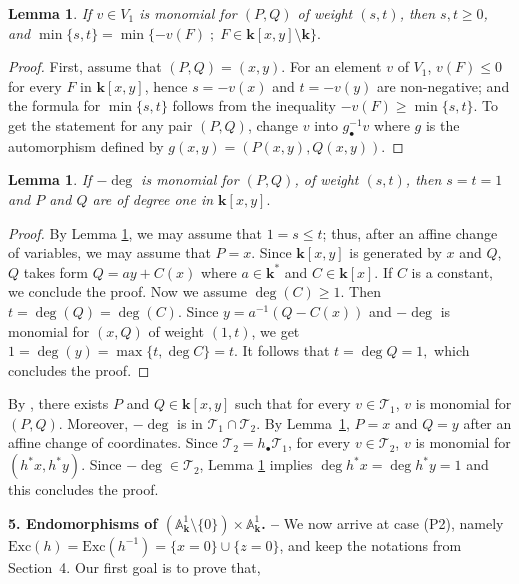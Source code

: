 \documentclass[reqno,oneside,12pt]{amsart}
\theoremstyle{plain}
\newtheorem{lem}[thm]{Lemma}
\theoremstyle{definition}
\def\bfk{{\mathbf{k}}}
\newcommand{\bbA}{{\mathbb{A}}}
\newcommand{\sT}{{\mathcal T}}
\def\Exc{{\text{Exc}}}
\begin{document}
{{{{\begin{lem}\label{lemprovow}If $v\in V_1$ is monomial for $(P,Q)$ of weight $(s,t)$, then   $s,t\geq 0$, and $\min\{s,t\}=\min\{-v(F) \; ; \; F\in \bfk[x,y]\setminus \bfk\}.$
\end{lem}
\begin{proof}
First, assume that $(P,Q)=(x,y)$. For an element $v$ of $V_1$, $v(F)\leq 0$ for every $F$ in $\bfk[x,y]$, hence $s=-v(x)$ and $t=-v(y)$
are non-negative; and the formula for $\min\{s,t\}$ follows from the inequality $-v(F)\geq \min\{s,t\}$. To get the statement for any pair $(P,Q)$, 
change $v$ into $g^{-1}_\bullet v$ where $g$ is the automorphism defined by $g(x,y)=(P(x,y),Q(x,y))$.
\end{proof}

\begin{lem}\label{lemdegmon}If $-\deg$ is monomial for $(P,Q)$, of weight $(s,t)$, then $s=t=1$ and $P$ and $Q$ are of degree one in $\bfk[x,y].$
\end{lem}

\begin{proof}By Lemma \ref{lemprovow}, we may assume that $1=s\leq t$; thus, 
after an affine change of variables, we may assume that $P=x.$ Since $\bfk[x,y]$ is generated by $x$ and $Q$, $Q$ takes form 
$Q=ay+C(x)$ where $a\in \bfk^*$ and $C\in \bfk[x]$. 
If $C$ is a constant, we conclude the proof. Now we assume $\deg (C)\geq 1$.
Then $t=\deg(Q)=\deg(C)$. Since $y=a^{-1}(Q-C(x))$ and $-\deg$ is monomial for $(x,Q)$ of weight $(1,t)$, we get $1=\deg(y)=\max\{t, \deg C\}=t$. It follows that $t=\deg Q=1,$ which concludes the proof.
\end{proof}

By \cite[Proposition 5.3 (b), (d)]{Favre2011}, there exists $P$ and $Q\in \bfk[x,y]$ such that 
for every $v\in \sT_1$, $v$ is monomial for $(P,Q)$. Moreover, $-\deg$ is in $\sT_1\cap \sT_2$. By Lemma~\ref{lemdegmon},  $P=x$ and $Q=y$ after an affine change of coordinates.
Since $\sT_2=h_{\bullet} \sT_1$, for every $v\in \sT_2$, $v$ is monomial for $(h^*x,h^*y).$ Since $-\deg\in \sT_2$,  Lemma \ref{lemdegmon} implies $\deg h^*x=\deg h^*y=1$ and this concludes the proof.
\endproof

\medskip

{\noindent}{\bf{5. Endomorphisms of $(\bbA^1_\bfk\setminus \{0 \})\times \bbA^1_\bfk$. --}}
We now arrive at case (P2), namely $\Exc(h)=\Exc(h^{-1})=\{x=0\}\cup \{z=0\}$, and keep the notations from Section~4.
Our first goal is to prove that, 

}}}}
\end{document}
